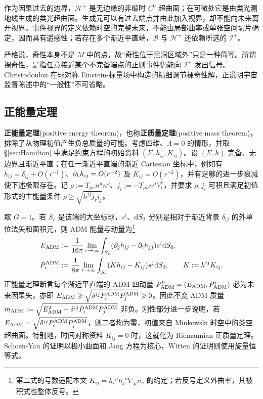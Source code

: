 作为因果过去的边界，$\mathcal H^+$ 是无边缘的非编时 $C^0$ 超曲面；在可微处它是由类光测地线生成的类光超曲面。生成元可以有过去端点并由此加入视界，却不能向未来离开视界。事件视界的定义依赖时空的完整未来，不能由局部曲率或单张空间切片确定，因而具有遥感性；若存在多个渐近平直端，$\mathcal B$ 与 $\mathcal H^+$ 还依赖所选的 $\mathscr I^+$。

严格说，奇性本身不是 $M$ 中的点，故“奇性位于黑洞区域外”只是一种简写。所谓裸奇性，是指任意接近某个不完备端点的正则事件仍能向 $\mathscr I^+$ 发出信号。Christodoulou 在球对称 Einstein-标量场中构造的精细调节裸奇性解，正说明宇宙监督陈述中的“一般性”不可省略。

\subsection{正能量定理}

\textbf{正能量定理}(positive energy theorem)，也称\textbf{正质量定理}(positive mass theorem)，排除了从物理初值产生负总质量的可能。考虑四维、$\Lambda=0$ 的情形，并取 \S\ref{sec:Hamilton} 中满足约束方程的初始资料 $(\Sigma,h_{ij},K_{ij})$。设 $(\Sigma,h)$ 完备、无边界且渐近平直；在任一渐近平直端的渐近 Cartesian 坐标中，例如有 $h_{ij}=\delta_{ij}+O(r^{-1})$、$\partial_kh_{ij}=O(r^{-2})$ 及 $K_{ij}=O(r^{-2})$，并有足够的进一步衰减使下述极限存在。记 $\rho:=T_{\mu\nu}n^\mu n^\nu$、$j_i:=-T_{\mu\nu}n^\mu V_i^\nu$，并要求 $\rho,j_i$ 可积且满足初值形式的主能量条件 $\rho\geqslant\sqrt{h^{ij}j_i j_j}$。

取 $G=1$。若 $S_r$ 是该端的大坐标球，$s^i$、$\dd S_0$ 分别是相对于渐近背景 $\delta_{ij}$ 的外单位法矢和面积元，则 ADM 能量与动量为\footnote{第二式的号数适配本文 $K_{ij}=h_i{}^\mu h_j{}^\nu\nabla_\mu n_\nu$ 的约定；若反号定义外曲率，其被积式也整体反号。}
\begin{align*}
    E_{\rm ADM}&:=\frac{1}{16\pi}\lim_{r\to\infty}\int_{S_r}(\partial_jh_{ij}-\partial_ih_{jj})s^i\dd S_0,\\
    P_i^{\rm ADM}&:=\frac{1}{8\pi}\lim_{r\to\infty}\int_{S_r}(Kh_{ij}-K_{ij})s^j\dd S_0,\qquad K:=h^{ij}K_{ij}.
\end{align*}
正能量定理断言每个渐近平直端的 ADM 四动量 $P^\mu_{\rm ADM}=(E_{\rm ADM},P^i_{\rm ADM})$ 必为未来因果矢，亦即 $E_{\rm ADM}\geqslant\sqrt{\delta^{ij}P_i^{\rm ADM}P_j^{\rm ADM}}\geqslant0$。因此不变 ADM 质量 $m_{\rm ADM}:=\sqrt{E_{\rm ADM}^2-\delta^{ij}P_i^{\rm ADM}P_j^{\rm ADM}}$ 非负。刚性部分进一步说明，若 $E_{\rm ADM}=\sqrt{\delta^{ij}P_i^{\rm ADM}P_j^{\rm ADM}}$，则二者均为零，初值来自 Minkowski 时空中的类空超曲面。特别地，时间对称资料 $K_{ij}=0$ 时，这就化为 Riemannian 正质量定理。Schoen-Yau 的证明以极小曲面和 Jang 方程为核心，Witten 的证明则使用旋量恒等式。

